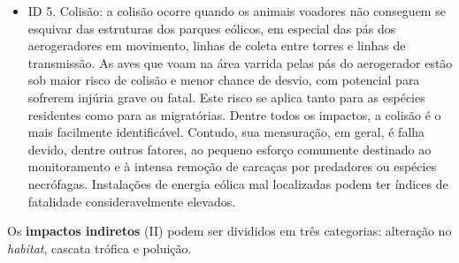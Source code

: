 \documentclass[
  oneside]{scrbook}
\begin{document}
\begin{itemize}
\item
  ID 5. Colisão: a colisão ocorre quando os animais voadores não conseguem se esquivar das estruturas dos parques eólicos, em especial das pás dos aerogeradores em movimento, linhas de coleta entre torres e linhas de transmissão. As aves que voam na área varrida pelas pás do aerogerador estão sob maior risco de colisão e menor chance de desvio, com potencial para sofrerem injúria grave ou fatal. Este risco se aplica tanto para as espécies residentes como para as migratórias. Dentre todos os impactos, a colisão é o mais facilmente identificável. Contudo, sua mensuração, em geral, é falha devido, dentre outros fatores, ao pequeno esforço comumente destinado ao monitoramento e à intensa remoção de carcaças por predadores ou espécies necrófagas. Instalações de energia eólica mal localizadas podem ter índices de fatalidade consideravelmente elevados.
\end{itemize}

Os \textbf{impactos indiretos} (II) podem ser divididos em três categorias: alteração no \emph{habitat}, cascata trófica e poluição.
\end{document}
